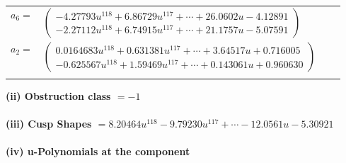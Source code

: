 \documentclass[1p]{elsarticle_modified}
\theoremstyle{definition}
\begin{document}
\begin{tabular}{m{7pt} m{180pt} m{7pt} m{180pt} }
\flushright $a_{6}=$&$\begin{pmatrix}-4.27793 u^{118}+6.86729 u^{117}+\cdots+26.0602 u-4.12891\\-2.27112 u^{118}+6.74915 u^{117}+\cdots+21.1757 u-5.07591\end{pmatrix}$ \\
\flushright $a_{2}=$&$\begin{pmatrix}0.0164683 u^{118}+0.631381 u^{117}+\cdots+3.64517 u+0.716005\\-0.625567 u^{118}+1.59469 u^{117}+\cdots+0.143061 u+0.960630\end{pmatrix}$\\&\end{tabular}
\flushleft \textbf{(ii) Obstruction class $= -1$}\\~\\
\flushleft \textbf{(iii) Cusp Shapes $= 8.20464 u^{118}-9.79230 u^{117}+\cdots-12.0561 u-5.30921$}\\~\\
\newpage\renewcommand{\arraystretch}{1}
\flushleft \textbf{(iv) u-Polynomials at the component}\newline \\
\end{document}
